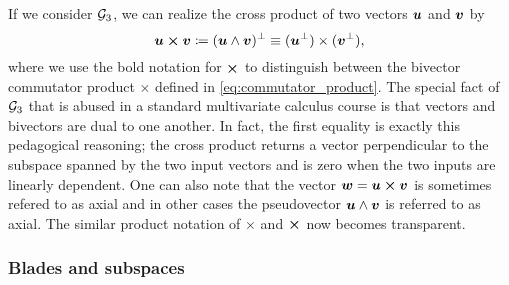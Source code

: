 \begin{remark}
\label{rem:cross_product}
If we consider $\mathcal{G}_3$, we can realize the cross product of two vectors $\boldsymbol{u}$ and $\boldsymbol{v}$ by
\begin{equation}
\boldsymbol{u} \boldsymbol{\times} \boldsymbol{v} \coloneqq (\boldsymbol{u}\wedge \boldsymbol{v})^\perp
\equiv (\boldsymbol{u}^\perp)\times (\boldsymbol{v}^\perp), 
\end{equation}
where we use the bold notation for $\boldsymbol{\times}$ to distinguish between the bivector commutator product $\times$ defined in \cref{eq:commutator_product}. The special fact of $\mathcal{G}_3$ that is abused in a standard multivariate calculus course is that vectors and bivectors are dual to one another. In fact, the first equality is exactly this pedagogical reasoning; the cross product returns a vector perpendicular to the subspace spanned by the two input vectors and is zero when the two inputs are linearly dependent. One can also note that the vector $\boldsymbol{w}=\boldsymbol{u}\boldsymbol{\times} \boldsymbol{v}$ is sometimes refered to as axial and in other cases the pseudovector $\boldsymbol{u}\wedge \boldsymbol{v}$ is referred to as axial. The similar product notation of $\times$ and $\boldsymbol{\times}$ now becomes transparent. 
\end{remark}


\subsubsection{Blades and subspaces}

